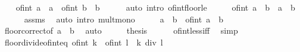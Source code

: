\begin{isabellebody}
\ \ \isamarkupfalse%
\ {\isachardoublequoteopen}of{\isacharunderscore}{\kern0pt}int\ {\isasymlfloor}a{\isasymrfloor}\ {\isasymle}\ a{\isachardoublequoteclose}\ \ {\isachardoublequoteopen}of{\isacharunderscore}{\kern0pt}int\ {\isasymlfloor}b{\isasymrfloor}\ {\isasymle}\ b{\isachardoublequoteclose}\isanewline
\ \ \ \ \isamarkupfalse%
\ {\isacharparenleft}{\kern0pt}auto\ intro{\isacharcolon}{\kern0pt}\ of{\isacharunderscore}{\kern0pt}int{\isacharunderscore}{\kern0pt}floor{\isacharunderscore}{\kern0pt}le{\isacharparenright}{\kern0pt}\isanewline
\ \ \isamarkupfalse%
\ \isamarkupfalse%
\ {\isachardoublequoteopen}of{\isacharunderscore}{\kern0pt}int\ {\isacharparenleft}{\kern0pt}{\isasymlfloor}a{\isasymrfloor}\ {\isacharasterisk}{\kern0pt}\ {\isasymlfloor}b{\isasymrfloor}{\isacharparenright}{\kern0pt}\ {\isasymle}\ a\ {\isacharasterisk}{\kern0pt}\ b{\isachardoublequoteclose}\isanewline
\ \ \ \ \isamarkupfalse%
\ assms\ \isamarkupfalse%
\ {\isacharparenleft}{\kern0pt}auto\ intro{\isacharbang}{\kern0pt}{\isacharcolon}{\kern0pt}\ mult{\isacharunderscore}{\kern0pt}mono{\isacharparenright}{\kern0pt}\isanewline
\ \ \isamarkupfalse%
\ \isamarkupfalse%
\ {\isachardoublequoteopen}a\ {\isacharasterisk}{\kern0pt}\ b\ {\isacharless}{\kern0pt}\ of{\isacharunderscore}{\kern0pt}int\ {\isacharparenleft}{\kern0pt}{\isasymlfloor}a\ {\isacharasterisk}{\kern0pt}\ b{\isasymrfloor}\ {\isacharplus}{\kern0pt}\ {}{\isacharparenright}{\kern0pt}{\isachardoublequoteclose}\isanewline
\ \ \ \ \isamarkupfalse%
\ floor{\isacharunderscore}{\kern0pt}correct{\isacharbrackleft}{\kern0pt}of\ {\isachardoublequoteopen}a\ {\isacharasterisk}{\kern0pt}\ b{\isachardoublequoteclose}{\isacharbrackright}{\kern0pt}\ \isamarkupfalse%
\ auto\isanewline
\ \ \isamarkupfalse%
\ \isamarkupfalse%
\ {\isacharquery}{\kern0pt}thesis\isanewline
\ \ \ \ \isamarkupfalse%
\ of{\isacharunderscore}{\kern0pt}int{\isacharunderscore}{\kern0pt}less{\isacharunderscore}{\kern0pt}iff\ \isamarkupfalse%
\ simp\isanewline
{}\isamarkupfalse%
%
\endisatagproof
{\isafoldproof}%
%
\isadelimproof
\isanewline
%
\endisadelimproof
\isanewline
{}\isamarkupfalse%
\ floor{\isacharunderscore}{\kern0pt}divide{\isacharunderscore}{\kern0pt}of{\isacharunderscore}{\kern0pt}int{\isacharunderscore}{\kern0pt}eq{\isacharcolon}{\kern0pt}\ {\isachardoublequoteopen}{\isasymlfloor}of{\isacharunderscore}{\kern0pt}int\ k\ {\isacharslash}{\kern0pt}\ of{\isacharunderscore}{\kern0pt}int\ l{\isasymrfloor}\ {\isacharequal}{\kern0pt}\ k\ div\ l{\isachardoublequoteclose}\isanewline

\end{isabellebody}
